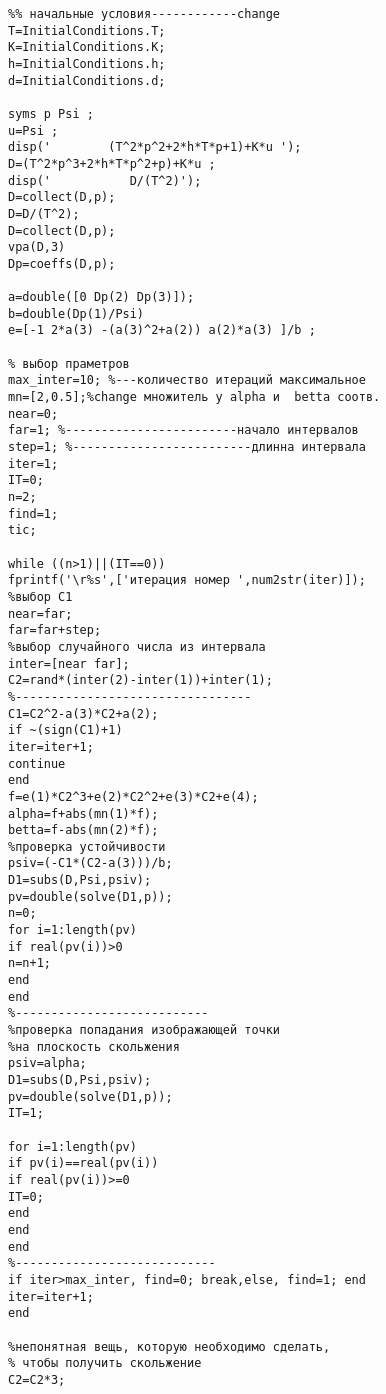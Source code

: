 \begin{verbatim}
%% начальные условия------------change
T=InitialConditions.T;
K=InitialConditions.K;
h=InitialConditions.h;
d=InitialConditions.d;

syms p Psi ;
u=Psi ;
disp('        (T^2*p^2+2*h*T*p+1)+K*u ');
D=(T^2*p^3+2*h*T*p^2+p)+K*u ;
disp('           D/(T^2)');
D=collect(D,p);
D=D/(T^2);
D=collect(D,p);
vpa(D,3)
Dp=coeffs(D,p);

a=double([0 Dp(2) Dp(3)]);
b=double(Dp(1)/Psi)
e=[-1 2*a(3) -(a(3)^2+a(2)) a(2)*a(3) ]/b ;

% выбор праметров 
max_inter=10; %---количество итераций максимальное
mn=[2,0.5];%change множитель у alpha и  betta соотв.
near=0;
far=1; %------------------------начало интервалов
step=1; %-------------------------длинна интервала
iter=1;
IT=0;
n=2;
find=1;
tic;

while ((n>1)||(IT==0))
fprintf('\r%s',['итерация номер ',num2str(iter)]);
%выбор C1
near=far;
far=far+step;
%выбор случайного числа из интервала
inter=[near far];
C2=rand*(inter(2)-inter(1))+inter(1);
%---------------------------------
C1=C2^2-a(3)*C2+a(2);
if ~(sign(C1)+1)
iter=iter+1;
continue
end
f=e(1)*C2^3+e(2)*C2^2+e(3)*C2+e(4);
alpha=f+abs(mn(1)*f);
betta=f-abs(mn(2)*f);
%проверка устойчивости
psiv=(-C1*(C2-a(3)))/b;
D1=subs(D,Psi,psiv);
pv=double(solve(D1,p));
n=0;
for i=1:length(pv)
if real(pv(i))>0
n=n+1;
end
end
%---------------------------
%проверка попадания изображающей точки 
%на плоскость скольжения
psiv=alpha;
D1=subs(D,Psi,psiv);
pv=double(solve(D1,p));
IT=1;

for i=1:length(pv)
if pv(i)==real(pv(i))
if real(pv(i))>=0
IT=0;
end
end
end
%----------------------------
if iter>max_inter, find=0; break,else, find=1; end
iter=iter+1;
end

%непонятная вещь, которую необходимо сделать,
% чтобы получить скольжение
C2=C2*3;

\end{verbatim}